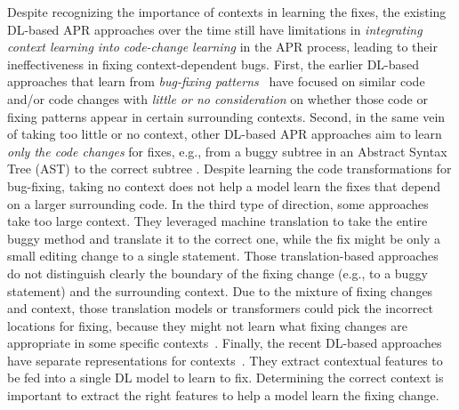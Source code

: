 Despite recognizing the importance of contexts in learning the fixes,
the existing DL-based APR approaches over the time still have
limitations in {\em integrating context learning into code-change
  learning} in the APR process, leading to their ineffectiveness in
fixing context-dependent bugs. First, the earlier DL-based approaches
that learn from {\em bug-fixing
  patterns}~\cite{white2016deep,gupta2017deepfix} have focused on
similar code and/or code changes with {\em little or no consideration}
on whether those code or fixing patterns appear in certain surrounding
contexts. Second, in the same vein of taking too little or no context,
other DL-based APR approaches aim to learn {\em only the code changes}
for fixes, e.g., from a buggy subtree in an Abstract Syntax Tree (AST)
to the correct subtree \cite{chakrabortycodit,see2017get}. Despite
learning the code transformations for bug-fixing, taking no context
does not help a model learn the fixes that depend on a larger
surrounding code. In the third type of direction, some
approaches~\cite{hata2018learning,tufano2019learning,tufano2018empirical}
take too large context. They leveraged machine translation to take the
entire buggy method and translate it to the correct one, while the fix
might be only a small editing change to a single statement. Those
translation-based approaches do not distinguish clearly the boundary
of the fixing change (e.g., to a buggy statement) and the surrounding
context. Due to the mixture of fixing changes and context, those
translation models or transformers could pick the incorrect locations
for fixing, because they might not learn what fixing changes are
appropriate in some specific contexts~\cite{icse20}. Finally, the
recent DL-based approaches have separate representations for
contexts~\cite{chen2018sequencer,cure-icse21,lutellier2020coconut}.
They extract contextual features to be fed into a single DL model to
learn to fix. Determining the correct context is important to extract
the right features to help a model learn the fixing change.




